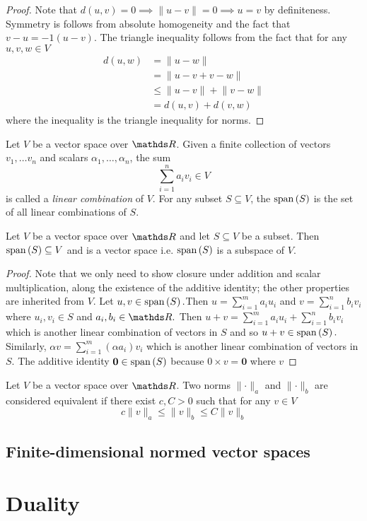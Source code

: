 \begin{proof}
Note that $d\left(u,v\right)=0\implies\lVert u-v\rVert=0\implies u=v$
by definiteness. Symmetry is follows from absolute homogeneity and
the fact that $v-u=-1\left(u-v\right).$ The triangle inequality follows
from the fact that for any $u,v,w\in V$
\begin{align*}
d\left(u,w\right) & =\lVert u-w\rVert\\
 & =\lVert u-v+v-w\rVert\\
 & \leq\lVert u-v\rVert+\lVert v-w\rVert\\
 & =d\left(u,v\right)+d\left(v,w\right)
\end{align*}
where the inequality is the triangle inequality for norms.
\end{proof}
\begin{defn}
\label{def:linearCombintation}Let $V$ be a vector space over $\R$.
Given a finite collection of vectors $v_{1},\ldots v_{n}$ and scalars
$\alpha_{1},\ldots,\alpha_{n}$, the sum
\[
\sum_{i=1}^{n}a_{i}v_{i}\in V
\]
is called a \emph{linear combination }of $V.$ For any subset $S\subseteq V$,
the $\mathrm{span}\left(S\right)$ is the set of all linear combinations
of $S$.
\end{defn}

\begin{prop}
\label{prop:spanIsSubspace}Let $V$ be a vector space over $\R$
and let $S\subseteq V$ be a subset. Then $\mathrm{span}\left(S\right)\subseteq V$
and is a vector space i.e. $\mathrm{span}\left(S\right)$ is a subspace of
$V.$
\end{prop}

\begin{proof}
Note that we only need to show closure under addition and scalar multiplication,
along the existence of the additive identity; the other properties
are inherited from $V$. Let $u,v\in\mathrm{span}\left(S\right).$Then $u=\sum_{i=1}^{m}a_{i}u_{i}$
and $v=\sum_{i=1}^{n}b_{i}v_{i}$ where $u_{i},v_{i}\in S$ and $a_{i},b_{i}\in\R.$
Then $u+v=\sum_{i=1}^{m}a_{i}u_{i}+\sum_{i=1}^{n}b_{i}v_{i}$ which
is another linear combination of vectors in $S$ and so $u+v\in\mathrm{span}\left(S\right).$
Similarly, $\alpha v=\sum_{i=1}^{m}\left(\alpha a_{i}\right)v_{i}$
which is another linear combination of vectors in $S$. The additive
identity $\mathbf{0}\in\mathrm{span}\left(S\right)$ because $0\times v=\mathbf{0}$
where $v$
\end{proof}
\begin{defn}
\label{def:equivalentNorm}Let $V$ be a vector space over $\R$.
Two norms $\lVert\cdot\rVert_{a}$ and $\lVert\cdot\rVert_{b}$ are
considered equivalent if there exist $c,C>0$ such that for any $v\in V$
\[
c\lVert v\rVert_{a}\leq\lVert v\rVert_{b}\leq C\lVert v\rVert_{b}
\]
\end{defn}


\subsection{Finite-dimensional normed vector spaces}

\section{Duality\label{sec:Duality}}
